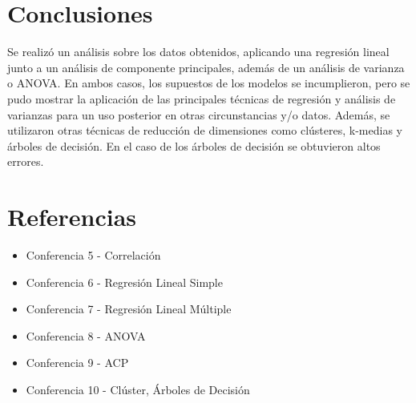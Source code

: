 \documentclass[a4paper,10pt,twocolumn]{article}
\begin{document}
\section{Conclusiones}\label{sec:conc}

Se realizó un análisis sobre los datos obtenidos, aplicando una regresión lineal junto a un análisis de componente principales, además de un análisis de varianza o ANOVA. En ambos casos, los supuestos de los modelos se incumplieron, pero se pudo mostrar la aplicación de las principales técnicas de regresión y análisis de varianzas para un uso posterior en otras circunstancias y/o datos. Además, se utilizaron otras técnicas de reducción de dimensiones como clústeres, k-medias y árboles de decisión. En el caso de los árboles de decisión se obtuvieron altos errores.

\section{Referencias}\label{sec:ref}

\begin{itemize}
	\item Conferencia 5 - Correlación
	\item Conferencia 6 - Regresión Lineal Simple
	\item Conferencia 7 - Regresión Lineal Múltiple
	\item Conferencia 8 - ANOVA
	\item Conferencia 9 - ACP
	\item Conferencia 10 - Clúster, Árboles de Decisión
\end{itemize}

\label{end}
\end{document}
